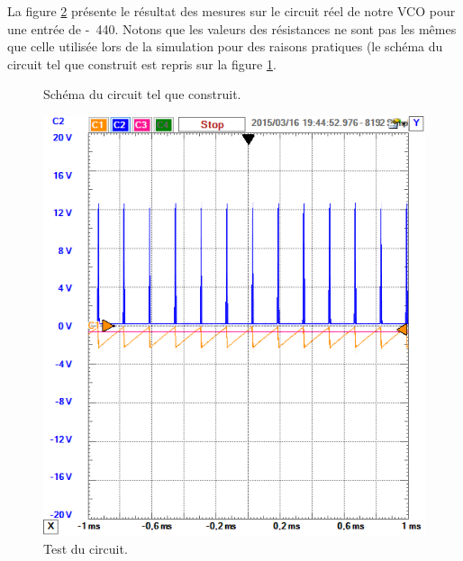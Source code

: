 La figure \ref{fig:test-440} présente le résultat des mesures sur le circuit 
réel de notre VCO pour une entrée de \unit{-440}{\milli\volt}. Notons 
que les valeurs des résistances ne sont pas les mêmes que celle
utilisée lors de la simulation pour des raisons pratiques (le
schéma du circuit tel que construit est repris sur la
figure \ref{fig:circuit-reel}.

\begin{figure}[ht]
	\centering
	\caption{Schéma du circuit tel que construit.}
	\label{fig:circuit-reel}
\end{figure}

\begin{figure}[ht]
	\centering
	\includegraphics[scale=0.7]{img/circuit-test-440mv.png}
	\caption{Test du circuit.}
	\label{fig:test-440}
\end{figure}


